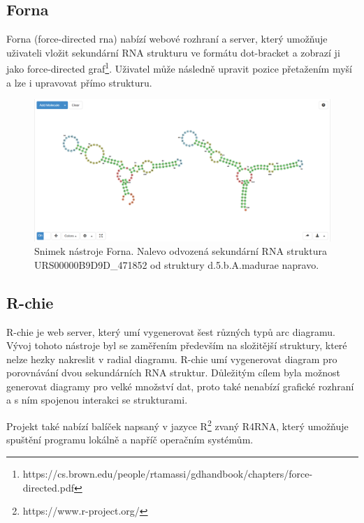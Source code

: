 \subsection{Forna} 

Forna\cite{Forna} (force-directed rna) nabízí webové rozhraní a server, který
umožňuje uživateli vložit sekundární RNA strukturu ve formátu dot-bracket a
zobrazí ji jako force-directed
graf\footnote{https://cs.brown.edu/people/rtamassi/gdhandbook/chapters/force-directed.pdf}.
Uživatel může následně upravit pozice přetažením myší a lze i upravovat přímo
strukturu. 

\begin{figure}[H]
  \centering
  \includegraphics[width=140mm]{../img/kap01/forna.png}
  \caption{Snimek nástroje Forna. Nalevo odvozená sekundární RNA
  struktura URS00000B9D9D\_471852 od struktury d.5.b.A.madurae napravo.}
\end{figure}

\subsection{R-chie} 

R-chie \cite{Rchie} je web server, který umí vygenerovat šest různých typů arc
diagramu. Vývoj tohoto nástroje byl se zaměřením především na složitější
struktury, které nelze hezky nakreslit v radial diagramu. R-chie umí
vygenerovat diagram pro porovnávání dvou sekundárních RNA struktur. Důležitým
cílem byla možnost generovat diagramy pro velké množství dat, proto také
nenabízí grafické rozhraní a s ním spojenou interakci se strukturami. 

Projekt také nabízí balíček napsaný v jazyce
R\footnote{https://www.r-project.org/} zvaný R4RNA, který umožňuje spuštění
programu lokálně a napříč operačním systémům.

